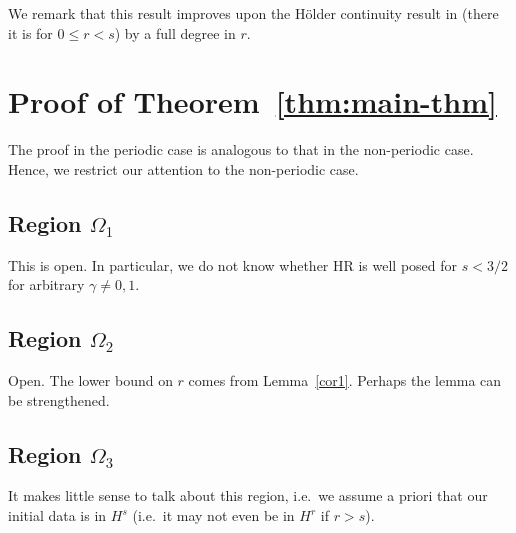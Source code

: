 \documentclass[12pt,reqno]{amsart}
\numberwithin{equation}{section}  %
\numberwithin{figure}{section}
\begin{document}
%
%
%
%
%
%
%
We remark that this result improves upon the H\"older continuity result in
\cite{Chen:2011fk} (there it is for $0 \le r < s$) by a full degree in $r$. 
%
%
%
%
\section{Proof of Theorem~\ref{thm:main-thm}}
%
%
The proof in the periodic case is analogous to that in the non-periodic case.
Hence, we restrict our attention to the non-periodic case. 

%
%
\subsection{Region $\Omega_{1}$} 
\label{ssec:reg-2}
This is open. In particular, we do not know whether HR is well posed for $s <
3/2$ for arbitrary $\gamma \neq
0,1$.
\subsection{Region $\Omega_{2}$} 
\label{ssec:reg-6}
Open. The lower bound on $r$ comes from Lemma~\ref{cor1}. Perhaps the lemma can
be strengthened.
\subsection{Region $\Omega_{3}$} 
\label{ssec:reg-7}
It makes little sense to talk about this region, 
i.e.\ we assume a priori that our initial
data is in $H^{s}$ (i.e.\ it may not even be in $H^{r}$ if $r > s$). 
\end{document}
